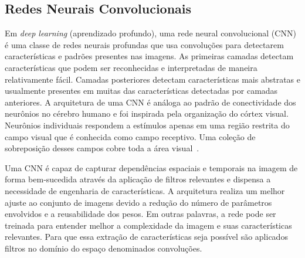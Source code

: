 \subsection{Redes Neurais Convolucionais}
Em \textit{deep learning} (aprendizado profundo), uma rede neural convolucional (\acrshort{CNN})~\cite{lecun2010convolutional} é uma classe de redes neurais profundas que usa convoluções para detectarem características e padrões presentes nas imagens. As primeiras camadas detectam características que podem ser reconhecidas e interpretadas de maneira relativamente fácil. Camadas posteriores detectam características mais abstratas e usualmente presentes em muitas das características detectadas por camadas anteriores. A arquitetura de uma \acrshort{CNN} é análoga ao padrão de conectividade dos neurônios no cérebro humano e foi inspirada pela organização do córtex visual. Neurônios individuais respondem a estímulos apenas em uma região restrita do campo visual que é conhecida como campo receptivo. Uma coleção de sobreposição desses campos cobre toda a área visual~\cite{livrodl}.


Uma \acrshort{CNN} é capaz de capturar dependências espaciais e temporais na imagem de forma bem-sucedida através da aplicação de filtros relevantes e dispensa a necessidade de engenharia de características. A arquitetura realiza um melhor ajuste ao conjunto de imagens devido a redução do número de parâmetros envolvidos e a reusabilidade dos pesos. Em outras palavras, a rede pode ser treinada para entender melhor a complexidade da imagem e suas características relevantes. Para que essa extração de características seja possível são aplicados filtros no domínio do espaço denominados convoluções. 
